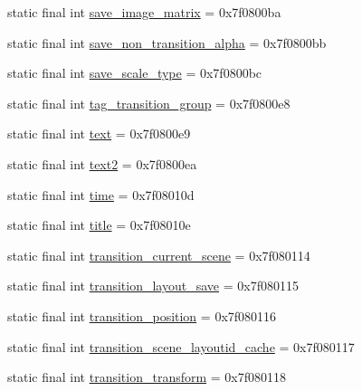 \begin{DoxyCompactItemize}
static final int \mbox{\hyperlink{classandroid_1_1support_1_1transition_1_1_r_1_1id_acab4a6d9fd322d835040991ed5709099}{save\+\_\+image\+\_\+matrix}} = 0x7f0800ba
\item 
static final int \mbox{\hyperlink{classandroid_1_1support_1_1transition_1_1_r_1_1id_a455fe1ba61028d91040bd0b7434c275a}{save\+\_\+non\+\_\+transition\+\_\+alpha}} = 0x7f0800bb
\item 
static final int \mbox{\hyperlink{classandroid_1_1support_1_1transition_1_1_r_1_1id_ad2b7283595e0f3038bc3ee7843eac9ba}{save\+\_\+scale\+\_\+type}} = 0x7f0800bc
\item 
static final int \mbox{\hyperlink{classandroid_1_1support_1_1transition_1_1_r_1_1id_a320c3fd792e45b64cca6aeaab36b0a86}{tag\+\_\+transition\+\_\+group}} = 0x7f0800e8
\item 
static final int \mbox{\hyperlink{classandroid_1_1support_1_1transition_1_1_r_1_1id_ac4cca2465737e7f17495b03f308e5bc8}{text}} = 0x7f0800e9
\item 
static final int \mbox{\hyperlink{classandroid_1_1support_1_1transition_1_1_r_1_1id_a0e51e599d4bbbbe0d0016d57657ce04d}{text2}} = 0x7f0800ea
\item 
static final int \mbox{\hyperlink{classandroid_1_1support_1_1transition_1_1_r_1_1id_a74264c86583c1f10acdd11d3f2c08e7e}{time}} = 0x7f08010d
\item 
static final int \mbox{\hyperlink{classandroid_1_1support_1_1transition_1_1_r_1_1id_ac37d5257839f0ecba0fac3657bd6b198}{title}} = 0x7f08010e
\item 
static final int \mbox{\hyperlink{classandroid_1_1support_1_1transition_1_1_r_1_1id_aef3ea53ee761d0649374566d52e85781}{transition\+\_\+current\+\_\+scene}} = 0x7f080114
\item 
static final int \mbox{\hyperlink{classandroid_1_1support_1_1transition_1_1_r_1_1id_a0da519ef0e965f22493e434e46d6b368}{transition\+\_\+layout\+\_\+save}} = 0x7f080115
\item 
static final int \mbox{\hyperlink{classandroid_1_1support_1_1transition_1_1_r_1_1id_a382451efc0f4b0eb63a180489417e330}{transition\+\_\+position}} = 0x7f080116
\item 
static final int \mbox{\hyperlink{classandroid_1_1support_1_1transition_1_1_r_1_1id_a38d13adf0b16756ebfc96af4df5a4e7b}{transition\+\_\+scene\+\_\+layoutid\+\_\+cache}} = 0x7f080117
\item 
static final int \mbox{\hyperlink{classandroid_1_1support_1_1transition_1_1_r_1_1id_a262eee6539d89b6200234e0c27e5d384}{transition\+\_\+transform}} = 0x7f080118
\end{DoxyCompactItemize}
